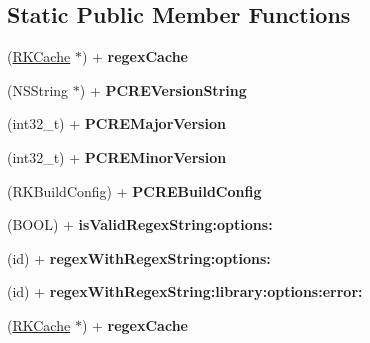 \subsection*{Static Public Member Functions}
\begin{DoxyCompactItemize}
\item 
\hypertarget{interface_r_k_regex_a0df9191ede8f223b3965e064eef8a92d}{(\hyperlink{interface_r_k_cache}{R\-K\-Cache} $\ast$) + {\bfseries regex\-Cache}}\label{interface_r_k_regex_a0df9191ede8f223b3965e064eef8a92d}

\item 
\hypertarget{interface_r_k_regex_a5c0527782846c2e8b203b6a696253dec}{(N\-S\-String $\ast$) + {\bfseries P\-C\-R\-E\-Version\-String}}\label{interface_r_k_regex_a5c0527782846c2e8b203b6a696253dec}

\item 
\hypertarget{interface_r_k_regex_abd8b65cafa5f7307ab695a55c768d57f}{(int32\-\_\-t) + {\bfseries P\-C\-R\-E\-Major\-Version}}\label{interface_r_k_regex_abd8b65cafa5f7307ab695a55c768d57f}

\item 
\hypertarget{interface_r_k_regex_afd9f97672fb4f9ea18320ff196b2fc5f}{(int32\-\_\-t) + {\bfseries P\-C\-R\-E\-Minor\-Version}}\label{interface_r_k_regex_afd9f97672fb4f9ea18320ff196b2fc5f}

\item 
\hypertarget{interface_r_k_regex_a13027f32da44ae7ac6f1e436c3aefba3}{(R\-K\-Build\-Config) + {\bfseries P\-C\-R\-E\-Build\-Config}}\label{interface_r_k_regex_a13027f32da44ae7ac6f1e436c3aefba3}

\item 
\hypertarget{interface_r_k_regex_a7a32c67fbe4f41a4ef7607f637d53254}{(B\-O\-O\-L) + {\bfseries is\-Valid\-Regex\-String\-:options\-:}}\label{interface_r_k_regex_a7a32c67fbe4f41a4ef7607f637d53254}

\item 
\hypertarget{interface_r_k_regex_ae2518fd9c82197099249faf23f772d9a}{(id) + {\bfseries regex\-With\-Regex\-String\-:options\-:}}\label{interface_r_k_regex_ae2518fd9c82197099249faf23f772d9a}

\item 
\hypertarget{interface_r_k_regex_aaaa85c739d69fbe02031fdf93a7986b8}{(id) + {\bfseries regex\-With\-Regex\-String\-:library\-:options\-:error\-:}}\label{interface_r_k_regex_aaaa85c739d69fbe02031fdf93a7986b8}

\item 
\hypertarget{interface_r_k_regex_a0df9191ede8f223b3965e064eef8a92d}{(\hyperlink{interface_r_k_cache}{R\-K\-Cache} $\ast$) + {\bfseries regex\-Cache}}\label{interface_r_k_regex_a0df9191ede8f223b3965e064eef8a92d}


\end{DoxyCompactItemize}
